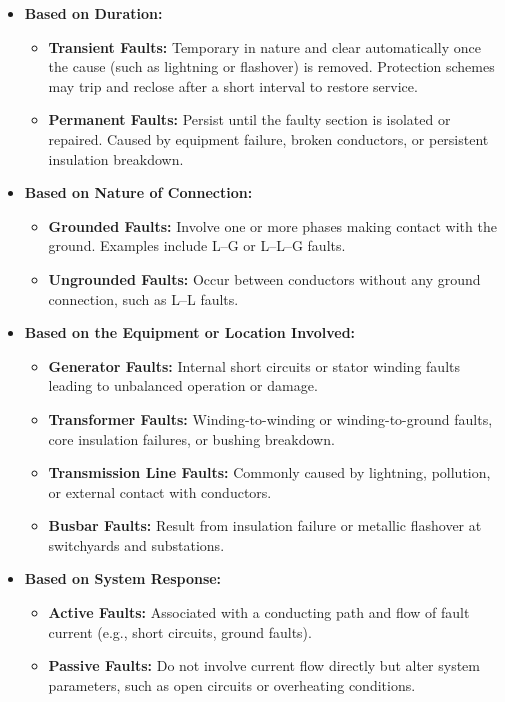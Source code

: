 \begin{itemize}
\item \textbf{Based on Duration:}
\begin{itemize}
\item \textbf{Transient Faults:} Temporary in nature and clear automatically once the cause (such as lightning or flashover) is removed.
Protection schemes may trip and reclose after a short interval to restore service.
\item \textbf{Permanent Faults:} Persist until the faulty section is isolated or repaired.
Caused by equipment failure, broken conductors, or persistent insulation breakdown.
\end{itemize}

\item \textbf{Based on Nature of Connection:}
\begin{itemize}
\item \textbf{Grounded Faults:} Involve one or more phases making contact with the ground.
Examples include L--G or L--L--G faults.
\item \textbf{Ungrounded Faults:} Occur between conductors without any ground connection, such as L--L faults.
\end{itemize}

\item \textbf{Based on the Equipment or Location Involved:}
\begin{itemize}
\item \textbf{Generator Faults:} Internal short circuits or stator winding faults leading to unbalanced operation or damage.
\item \textbf{Transformer Faults:} Winding-to-winding or winding-to-ground faults, core insulation failures, or bushing breakdown.
\item \textbf{Transmission Line Faults:} Commonly caused by lightning, pollution, or external contact with conductors.
\item \textbf{Busbar Faults:} Result from insulation failure or metallic flashover at switchyards and substations.
\end{itemize}

\item \textbf{Based on System Response:}
\begin{itemize}
\item \textbf{Active Faults:} Associated with a conducting path and flow of fault current (e.g., short circuits, ground faults).
\item \textbf{Passive Faults:} Do not involve current flow directly but alter system parameters, such as open circuits or overheating conditions.
\end{itemize}


\end{itemize}
